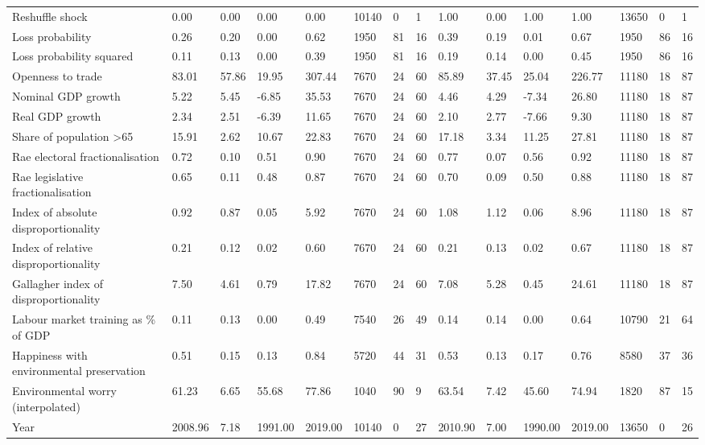 \begin{longtable}{lllllllllllllll}
Reshuffle shock & 0.00 & 0.00 & 0.00 & 0.00 & 10140 & 0 & 1 & 1.00 & 0.00 & 1.00 & 1.00 & 13650 & 0 & 1\\
Loss probability & 0.26 & 0.20 & 0.00 & 0.62 & 1950 & 81 & 16 & 0.39 & 0.19 & 0.01 & 0.67 & 1950 & 86 & 16\\
\addlinespace
Loss probability squared & 0.11 & 0.13 & 0.00 & 0.39 & 1950 & 81 & 16 & 0.19 & 0.14 & 0.00 & 0.45 & 1950 & 86 & 16\\
Openness to trade & 83.01 & 57.86 & 19.95 & 307.44 & 7670 & 24 & 60 & 85.89 & 37.45 & 25.04 & 226.77 & 11180 & 18 & 87\\
Nominal GDP growth & 5.22 & 5.45 & -6.85 & 35.53 & 7670 & 24 & 60 & 4.46 & 4.29 & -7.34 & 26.80 & 11180 & 18 & 87\\
Real GDP growth & 2.34 & 2.51 & -6.39 & 11.65 & 7670 & 24 & 60 & 2.10 & 2.77 & -7.66 & 9.30 & 11180 & 18 & 87\\
Share of population >65 & 15.91 & 2.62 & 10.67 & 22.83 & 7670 & 24 & 60 & 17.18 & 3.34 & 11.25 & 27.81 & 11180 & 18 & 87\\
\addlinespace
Rae electoral fractionalisation & 0.72 & 0.10 & 0.51 & 0.90 & 7670 & 24 & 60 & 0.77 & 0.07 & 0.56 & 0.92 & 11180 & 18 & 87\\
Rae legislative fractionalisation & 0.65 & 0.11 & 0.48 & 0.87 & 7670 & 24 & 60 & 0.70 & 0.09 & 0.50 & 0.88 & 11180 & 18 & 87\\
Index of absolute disproportionality & 0.92 & 0.87 & 0.05 & 5.92 & 7670 & 24 & 60 & 1.08 & 1.12 & 0.06 & 8.96 & 11180 & 18 & 87\\
Index of relative disproportionality & 0.21 & 0.12 & 0.02 & 0.60 & 7670 & 24 & 60 & 0.21 & 0.13 & 0.02 & 0.67 & 11180 & 18 & 87\\
Gallagher index of disproportionality & 7.50 & 4.61 & 0.79 & 17.82 & 7670 & 24 & 60 & 7.08 & 5.28 & 0.45 & 24.61 & 11180 & 18 & 87\\
\addlinespace
Labour market training as \% of GDP & 0.11 & 0.13 & 0.00 & 0.49 & 7540 & 26 & 49 & 0.14 & 0.14 & 0.00 & 0.64 & 10790 & 21 & 64\\
Happiness with environmental preservation & 0.51 & 0.15 & 0.13 & 0.84 & 5720 & 44 & 31 & 0.53 & 0.13 & 0.17 & 0.76 & 8580 & 37 & 36\\
Environmental worry (interpolated) & 61.23 & 6.65 & 55.68 & 77.86 & 1040 & 90 & 9 & 63.54 & 7.42 & 45.60 & 74.94 & 1820 & 87 & 15\\
Year & 2008.96 & 7.18 & 1991.00 & 2019.00 & 10140 & 0 & 27 & 2010.90 & 7.00 & 1990.00 & 2019.00 & 13650 & 0 & 26\\
\bottomrule
\end{longtable}
